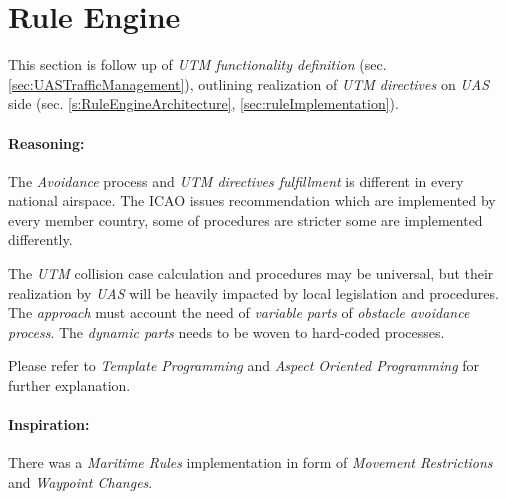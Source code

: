 \cleardoublepage
\section{Rule Engine}\label{sec:ruleEngine}

\noindent This section is follow up of \emph{UTM functionality definition} (sec. \ref{sec:UASTrafficManagement}), outlining realization of \emph{UTM directives} on \emph{UAS} side (sec. \ref{s:RuleEngineArchitecture},  \ref{sec:ruleImplementation}).

\paragraph{Reasoning:} The \emph{Avoidance} process and \emph{UTM directives fulfillment} is different in every national airspace. The ICAO issues recommendation \cite{icao4444,icaoAnnex2} which are implemented by every member country, some of procedures are stricter some are implemented differently.

The \emph{UTM} collision case calculation and procedures may be universal, but their realization by \emph{UAS} will be heavily impacted by local legislation and procedures.  The \emph{approach} must account the need of \emph{variable parts} of \emph{obstacle avoidance process}. The \emph{dynamic parts} needs to be woven to hard-coded processes. 

\begin{note}
	Please refer to \emph{Template Programming} and \emph{Aspect Oriented Programming} for further explanation.
\end{note}

\paragraph{Inspiration:} There was a \emph{Maritime Rules} implementation \cite{benjamin2006navigation} in form of \emph{Movement Restrictions} and \emph{Waypoint Changes}.
